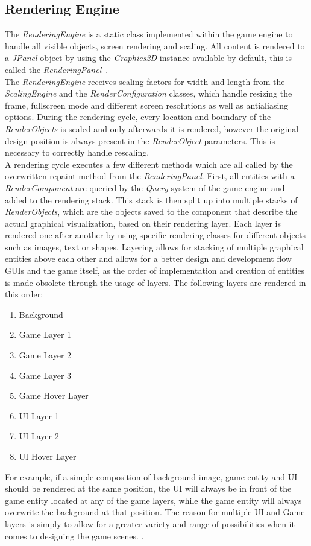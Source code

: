 \subsection{Rendering Engine}\label{subsec:graphics-engine}
The \textit{RenderingEngine} is a static class implemented within the game engine to handle all visible objects, screen rendering and scaling.
All content is rendered to a \textit{JPanel} object by using the \textit{Graphics2D} instance available by default, this is called the \textit{RenderingPanel}~\cite{jpanel,graphics2d}.
\\
The \textit{RenderingEngine} receives scaling factors for width and length from the \textit{ScalingEngine} and the \textit{RenderConfiguration}
classes, which handle resizing the frame,
fullscreen mode and different screen resolutions as well as antialiasing options.
During the rendering cycle, every location and boundary of the \textit{RenderObjects} is scaled and only afterwards it is rendered, however the original design position
is always present in the \textit{RenderObject} parameters.
This is necessary to correctly handle rescaling.
\\
A rendering cycle executes a few different methods which are all called by the overwritten repaint method from the \textit{RenderingPanel}.
First, all entities with a \textit{RenderComponent} are queried by the \textit{Query} system of the game engine and added to the rendering stack.
This stack is then split up into multiple stacks of \textit{RenderObjects}, which are the objects saved to the component that describe the actual
graphical visualization, based
on their rendering layer.
Each layer is rendered one after another by using specific rendering classes for different objects such as images, text or shapes.
Layering allows for stacking of multiple graphical entities above each other and allows for a better design and development flow GUIs and the game itself,
as the order of implementation and creation of entities is made obsolete through the usage of layers.
The following layers are rendered in this order:
\begin{enumerate}
    \item Background
    \item Game Layer 1
    \item Game Layer 2
    \item Game Layer 3
    \item Game Hover Layer
    \item UI Layer 1
    \item UI Layer 2
    \item UI Hover Layer
\end{enumerate}
For example, if a simple composition of background image, game entity and UI should be rendered at the same position,
the UI will always be in front of the game entity located at any of the game layers,
while the game entity will always overwrite the background at that position.
The reason for multiple UI and Game layers is simply to allow for a greater variety and range of possibilities when it comes to designing the game scenes.
.
